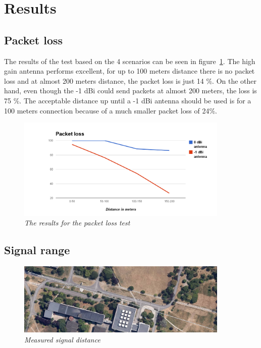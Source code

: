 \section{Results}
 
\subsection{Packet loss}

The results of the test based on the 4 scenarios can be seen in figure~\ref{fig:packet_loss}. The high gain antenna performs excellent, for up to 100 meters distance there is no packet loss and at almost 200 meters distance, the packet loss is just 14 \%. On the other hand, even though the -1 dBi could send packets at almost 200 meters, the loss is 75 \%. The acceptable distance up until a -1 dBi antenna should be used is for a 100 meters connection because of a much smaller packet loss of 24\%. 

\begin{figure}[ht]
\begin{center}
\includegraphics[width=0.9\textwidth]{img/packet_loss.png}
\end{center}
\caption{\small \itshape{The results for the packet loss test}}
  \label{fig:packet_loss}
\end{figure}
 
\subsection{Signal range}

\begin{figure}[ht]
\begin{center}
\includegraphics[width=0.9\textwidth]{img/distance.png}
\end{center}
\caption{\small \itshape{Measured signal distance}}
  \label{fig:distance}
\end{figure}


